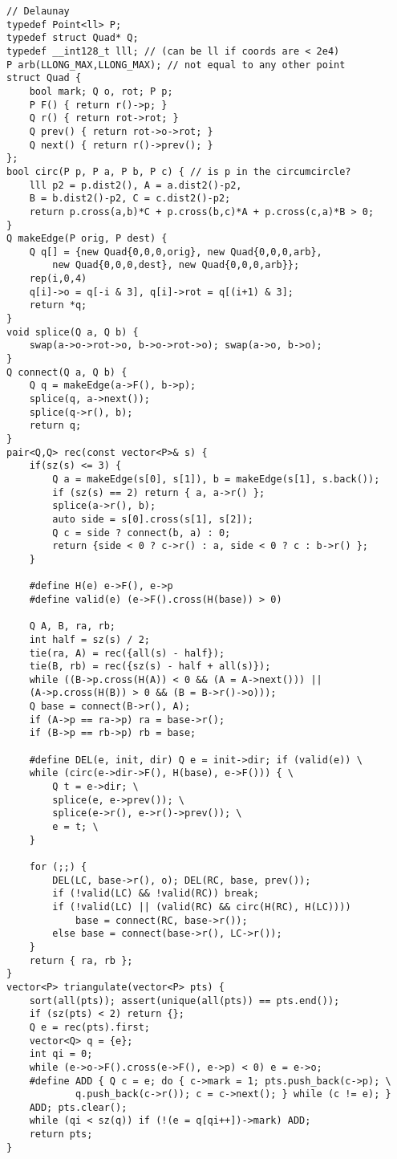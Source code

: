 \documentclass[a4paper,9pt]{article}
\begin{document}
\begin{lstlisting}
// Delaunay
typedef Point<ll> P;
typedef struct Quad* Q;
typedef __int128_t lll; // (can be ll if coords are < 2e4)
P arb(LLONG_MAX,LLONG_MAX); // not equal to any other point
struct Quad {
	bool mark; Q o, rot; P p;
	P F() { return r()->p; }
	Q r() { return rot->rot; }
	Q prev() { return rot->o->rot; }
	Q next() { return r()->prev(); }
};
bool circ(P p, P a, P b, P c) { // is p in the circumcircle?
	lll p2 = p.dist2(), A = a.dist2()-p2,
	B = b.dist2()-p2, C = c.dist2()-p2;
	return p.cross(a,b)*C + p.cross(b,c)*A + p.cross(c,a)*B > 0;
}
Q makeEdge(P orig, P dest) {
	Q q[] = {new Quad{0,0,0,orig}, new Quad{0,0,0,arb},
		new Quad{0,0,0,dest}, new Quad{0,0,0,arb}};
	rep(i,0,4)
	q[i]->o = q[-i & 3], q[i]->rot = q[(i+1) & 3];
	return *q;
}
void splice(Q a, Q b) {
	swap(a->o->rot->o, b->o->rot->o); swap(a->o, b->o);
}
Q connect(Q a, Q b) {
	Q q = makeEdge(a->F(), b->p);
	splice(q, a->next());
	splice(q->r(), b);
	return q;
}
pair<Q,Q> rec(const vector<P>& s) {
	if(sz(s) <= 3) {
		Q a = makeEdge(s[0], s[1]), b = makeEdge(s[1], s.back());
		if (sz(s) == 2) return { a, a->r() };
		splice(a->r(), b);
		auto side = s[0].cross(s[1], s[2]);
		Q c = side ? connect(b, a) : 0;
		return {side < 0 ? c->r() : a, side < 0 ? c : b->r() };
	}

	#define H(e) e->F(), e->p
	#define valid(e) (e->F().cross(H(base)) > 0)
	
	Q A, B, ra, rb;
	int half = sz(s) / 2;
	tie(ra, A) = rec({all(s) - half});
	tie(B, rb) = rec({sz(s) - half + all(s)});
	while ((B->p.cross(H(A)) < 0 && (A = A->next())) ||
	(A->p.cross(H(B)) > 0 && (B = B->r()->o)));
	Q base = connect(B->r(), A);
	if (A->p == ra->p) ra = base->r();
	if (B->p == rb->p) rb = base;
	
	#define DEL(e, init, dir) Q e = init->dir; if (valid(e)) \
	while (circ(e->dir->F(), H(base), e->F())) { \
		Q t = e->dir; \
		splice(e, e->prev()); \
		splice(e->r(), e->r()->prev()); \
		e = t; \
	}

	for (;;) {
		DEL(LC, base->r(), o); DEL(RC, base, prev());
		if (!valid(LC) && !valid(RC)) break;
		if (!valid(LC) || (valid(RC) && circ(H(RC), H(LC))))
			base = connect(RC, base->r());
		else base = connect(base->r(), LC->r());
	}
	return { ra, rb };
}
vector<P> triangulate(vector<P> pts) {
	sort(all(pts)); assert(unique(all(pts)) == pts.end());
	if (sz(pts) < 2) return {};
	Q e = rec(pts).first;
	vector<Q> q = {e};
	int qi = 0;
	while (e->o->F().cross(e->F(), e->p) < 0) e = e->o;
	#define ADD { Q c = e; do { c->mark = 1; pts.push_back(c->p); \
			q.push_back(c->r()); c = c->next(); } while (c != e); }
	ADD; pts.clear();
	while (qi < sz(q)) if (!(e = q[qi++])->mark) ADD;
	return pts;
}
\end{lstlisting}
\end{document}
